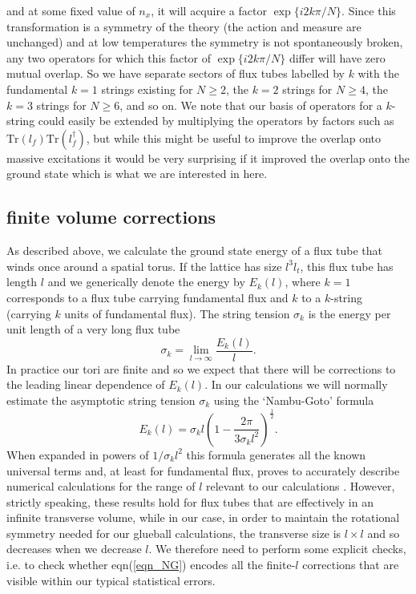 \documentclass[12pt]{article}
\begin{document}
and at some fixed value of $n_x$, it will acquire a factor $\exp\{i2k\pi /N\}$.
Since this transformation is a symmetry of the theory (the action and measure are
unchanged) and at low temperatures the symmetry is not spontaneously broken,
any two operators for which this factor of $\exp\{i2k\pi /N\}$ differ will
have zero mutual overlap. So we have separate sectors of flux tubes labelled
by $k$ with the fundamental $k=1$ strings existing for $N\geq 2$,
the $k=2$ strings for $N\geq 4$, the $k=3$ strings for $N\geq 6$, and so on.
We note that our basis of operators for a $k$-string could easily be extended by
multiplying the operators by factors such as $\mathrm{Tr}(l_f)\mathrm{Tr}(l_f^\dagger)$,
but while this might be useful to improve the overlap onto massive excitations
it would be very surprising if it improved the overlap onto the ground state
which is what we are interested in here.


%
%
\subsection{finite volume corrections}
\label{subsection_KcorrnV}


As described above, we calculate the ground state energy of a flux tube that winds once around
a spatial torus. If the lattice has size $l^3l_t$, this flux tube has length $l$ and we generically
denote the energy by $E_k(l)$, where $k=1$ corresponds to a flux tube carrying fundamental flux
and $k$ to a $k$-string (carrying $k$ units of fundamental flux). The string tension $\sigma_k$
is the energy per unit length of a very long flux tube
%
\begin{equation}
\sigma_k = \lim_{l\to\infty}\frac{E_k(l)}{l}.
  \label{eqn_K}
\end{equation}
%
In practice our tori are finite and so we expect that there will be corrections to the
leading linear dependence of $E_k(l)$.
In our calculations we will normally estimate the asymptotic string tension
$\sigma_k$ using the `Nambu-Goto' formula
%
\begin{equation}
E_k(l) = \sigma_k l\left( 1 - \frac{2\pi}{3\sigma_k l^2}\right)^{\frac{1}{2}}.
  \label{eqn_NG}
\end{equation}
%
When expanded in powers of $1/\sigma_kl^2$ this formula generates all the known universal terms
%
\cite{string_1,string_2,string_3,string_4}
%
and, at least for fundamental flux, proves to accurately describe numerical calculations for the range
of $l$ relevant to our calculations
%
\cite{AABBMT_K}.
%
However, strictly speaking, these results hold for flux tubes that are effectively in an infinite
transverse volume, while in our case, in order to maintain the rotational symmetry needed for our glueball
calculations, the transverse size is $l\times l$ and so decreases when we decrease $l$.
We therefore need to perform some explicit checks, i.e. to check whether eqn(\ref{eqn_NG}) encodes all
the finite-$l$ corrections that are visible within our typical statistical errors.
\end{document}
